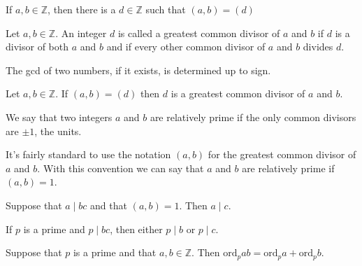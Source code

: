 \begin{lemma}
If $a,b\in \mathbb{Z}$, then there is a $d\in \mathbb{Z}$ such that $(a, b)=(d)$
\end{lemma}
\begin{definition}
Let $a,b\in\mathbb{Z}$. An integer $d$ is called a greatest common divisor of $a$ and $b$ if $d$ is a divisor of both $a$ and $b$ and if every other common divisor of $a$ and $b$ divides $d$.
\end{definition}
\begin{remark}
The gcd of two numbers, if it exists, is determined up to sign.
\end{remark}
\begin{lemma}
Let $a,b\in\mathbb{Z}$. If $(a,b) = (d)$ then $d$ is a greatest common divisor of $a$ and $b$.
\end{lemma}
\begin{definition}
We say that two integers $a$ and $b$ are relatively prime if the only common divisors are $\pm1$, the units.
\end{definition}
It's fairly standard to use the notation $(a, b)$ for the greatest common divisor of $a$ and $b$. With this convention we can say that $a$ and $b$ are relatively prime if $(a,b)=1$.
\begin{proposition}
Suppose that $a\mid bc$ and that $(a,b)=1$. Then $a\mid c$.
\end{proposition}
\begin{corollary}
If $p$ is a prime and $p\mid bc$, then either $p\mid b$ or $p\mid c$.
\end{corollary}
\begin{corollary}
Suppose that $p$ is a prime and that $a,b\in\mathbb{Z}$. Then $\mbox{ord}_pab=\mbox{ord}_pa+\mbox{ord}_pb.$
\end{corollary}

